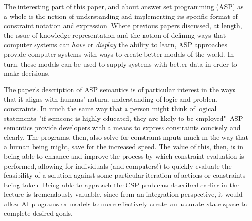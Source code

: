 \documentclass{article}
\begin{document}
  
  \graphicspath{{./images/}}
\par The interesting part of this paper, and about answer set programming (ASP) as a whole is the notion of understanding and implementing its specific format of constraint notation and expression.
Where previous papers discussed, at length, the issue of knowledge representation and the notion of defining ways that computer systems can \textit{have} or \textit{display} the ability to learn, ASP approaches provide computer systems with ways to create better models of the world.
In turn, these models can be used to supply systems with better data in order to make decisions.

\par The paper's description of ASP semantics is of particular interest in the ways that it aligns with humans' natural understanding of logic and problem constraints.
In much the same way that a person might think of logical statements--"if someone is highly educated, they are likely to be employed"--ASP semantics provide developers with a means to express constraints concisely and clearly.
The programs, then, also solve for constraint inputs much in the way that a human being might, save for the increased speed.
The value of this, then, is in being able to enhance and improve the process by which constraint evaluation is performed, allowing for individuals (and computers!) to quickly evaluate the feasibility of a solution against some particular iteration of actions or constraints being taken.
Being able to approach the CSP problems described earlier in the lecture is tremendously valuable, since from an integration perspective, it would allow AI programs or models to more effectively create an accurate state space to complete desired goals.
\end{document}
